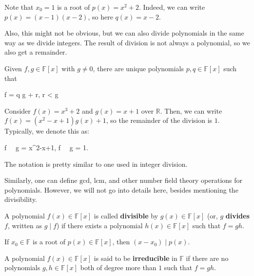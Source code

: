 \documentclass[../lecture-notes-148x210.tex]{subfiles}
\begin{document}
\begin{example}
    Note that $x_0=1$ is a root of $p(x) = x^2+2$. Indeed, we can write $p(x) = (x-1)(x-2)$, so here $q(x) = x-2$.
\end{example}

Also, this might not be obvious, but we can also divide polynomials in the same way as we divide integers. The result of division is not always a polynomial, so we also get a remainder.

\begin{theorem}
    Given $f,g \in \mathbb{F}[x]$ with $g \neq 0$, there are unique polynomials $p,q \in \mathbb{F}[x]$ such that 
    \begin{xequation}
        f = q \cdot g + r,  \leq \deg r < \deg g
    \end{xequation}
\end{theorem}

\begin{example}
    Consider $f(x) = x^3+2$ and $g(x) = x+1$ over $\mathbb{R}$. Then, we can write $f(x) = (x^2-x+1)g(x) + 1$, so the remainder of the division is $1$. Typically, we denote this as:
    \begin{xequation*}
        f \,  \, g = x^2-x+1, \quad f \,  \, g = 1.
    \end{xequation*}

    The notation is pretty similar to one used in integer division.
\end{example}

Similarly, one can define $\text{gcd}$, $\text{lcm}$, and other number field theory operations for polynomials. However, we will not go into details here, besides mentioning the divisibility.

\begin{definition}
    A polynomial $f(x) \in \mathbb{F}[x]$ is called \textbf{divisible} by $g(x) \in \mathbb{F}[x]$ (or, $g$ \textbf{divides} $f$, written as $g \mid f$) if there exists a polynomial $h(x) \in \mathbb{F}[x]$ such that $f=gh$.
\end{definition}

\begin{theorem}
    If $x_0 \in \mathbb{F}$ is a root of $p(x) \in \mathbb{F}[x]$, then $(x-x_0) \mid p(x)$.
\end{theorem}

\begin{definition}
    A polynomial $f(x) \in \mathbb{F}[x]$ is said to be \textbf{irreducible} in $\mathbb{F}$ if there are no polynomials $g,h \in \mathbb{F}[x]$ both of degree more than $1$ such that $f = gh$.
\end{definition}
\end{document}
